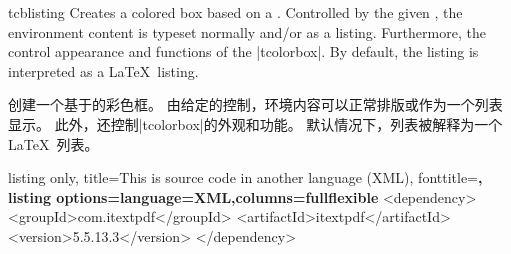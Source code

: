 \begin{docEnvironment}{tcblisting}{}
Creates a colored box based on a .
Controlled by the given , the
environment content is typeset normally and/or as a listing.
Furthermore, the  control appearance and functions of
the |tcolorbox|.
By default, the listing is interpreted as a \LaTeX\ listing.

创建一个基于的彩色框。 由给定的控制，环境内容可以正常排版或作为一个列表显示。 此外，还控制|tcolorbox|的外观和功能。 默认情况下，列表被解释为一个\LaTeX\ 列表。


\begin{dispExample}
\begin{tcblisting}{listing only,
title=This is source code in another language (XML), fonttitle=\bfseries,
listing options={language=XML,columns=fullflexible}}
<dependency>
  <groupId>com.itextpdf</groupId>
  <artifactId>itextpdf</artifactId>
  <version>5.5.13.3</version>
</dependency>
\end{tcblisting}
\end{dispExample}





\end{docEnvironment}
